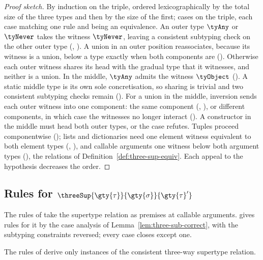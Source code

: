 \begin{proof}[Proof sketch]
By induction on the triple, ordered lexicographically by the total size of the three types and
then by the size of the first; cases on the triple, each case matching one rule and being an equivalence. An outer
type $\tyAny$ or $\tyNever$ takes the witness $\tyNever$, leaving a consistent subtyping check on
the other outer type (, ). A union in
an outer position reassociates, because its witness is a union, below a type exactly when both
components are (). Otherwise each outer witness shares its
head with the gradual type that it witnesses, and neither is a union. In the middle, $\tyAny$ admits the witness $\tyObject$
(). A static middle type is its own sole concretisation, so sharing is
trivial and two consistent subtyping checks remain (). For a union in
the middle, inversion sends each outer witness into one component: the same component
(, ), or different components, in
which case the witnesses no longer interact (). A constructor in the
middle must head both outer types, or the case refutes. Tuples proceed componentwise
(); lists and dictionaries need one element witness equivalent to both
element types (, ), and callable arguments one
witness below both argument types (), the relations of
Definition~\ref{def:three-sup-equiv}. Each appeal to the hypothesis decreases the order.
\end{proof}

\subsection{Rules for $\threeSup{\gty{\tau}}{\gty{\sigma}}{\gty{\tau}'}$}

The rules of  take the supertype relation as premises at callable
arguments.  gives rules for it by the case analysis of
Lemma~\ref{lem:three-sub-correct}, with the subtyping constraints reversed; every case
closes except one.

\begin{lemma}
\label{lem:three-sup-sound}
The rules of  derive only instances of the consistent three-way
supertype relation.
\end{lemma}

